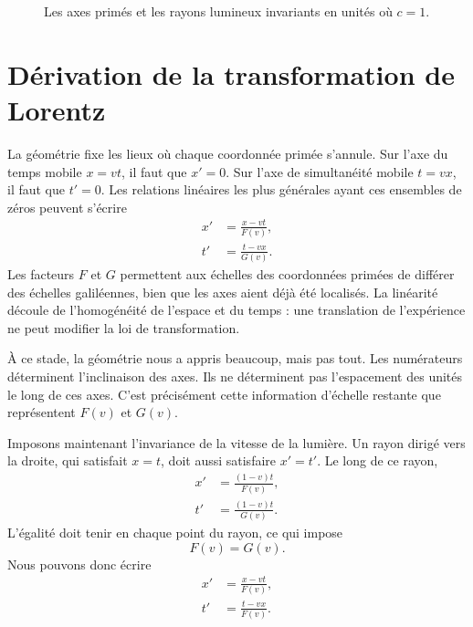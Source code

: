 \begin{figure}[H]\centering
{}\caption{Les axes primés et les rayons lumineux invariants en unités où \(c=1\).}\end{figure}

\section{Dérivation de la transformation de Lorentz}

La géométrie fixe les lieux où chaque coordonnée primée s’annule. Sur l’axe du temps mobile \(x=vt\), il faut que \(x'=0\). Sur l’axe de simultanéité mobile \(t=vx\), il faut que \(t'=0\). Les relations linéaires les plus générales ayant ces ensembles de zéros peuvent s’écrire
\begin{align}
x'&=\frac{x-vt}{F(v)},\\
t'&=\frac{t-vx}{G(v)}.
\label{eq:fg-ansatz}
\end{align}
Les facteurs \(F\) et \(G\) permettent aux échelles des coordonnées primées de différer des échelles galiléennes, bien que les axes aient déjà été localisés. La linéarité découle de l’homogénéité de l’espace et du temps : une translation de l’expérience ne peut modifier la loi de transformation.

À ce stade, la géométrie nous a appris beaucoup, mais pas tout. Les numérateurs déterminent l’inclinaison des axes. Ils ne déterminent pas l’espacement des unités le long de ces axes. C’est précisément cette information d’échelle restante que représentent \(F(v)\) et \(G(v)\).

Imposons maintenant l’invariance de la vitesse de la lumière. Un rayon dirigé vers la droite, qui satisfait \(x=t\), doit aussi satisfaire \(x'=t'\). Le long de ce rayon,
\begin{align}
x'&=\frac{(1-v)t}{F(v)},\\
t'&=\frac{(1-v)t}{G(v)}.
\end{align}
L’égalité doit tenir en chaque point du rayon, ce qui impose
\begin{equation}
F(v)=G(v).
\end{equation}
Nous pouvons donc écrire
\begin{align}
x'&=\frac{x-vt}{F(v)},\\
t'&=\frac{t-vx}{F(v)}.
\label{eq:common-f}
\end{align}

